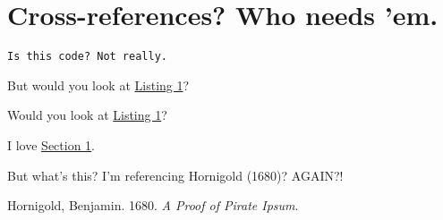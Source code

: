 \hypertarget{me}{%
\section{Cross-references? Who needs 'em.}\label{me}}

\hypertarget{snippet}{%
\label{snippet}}%
\begin{verbatim}
Is this code? Not really.
\end{verbatim}

But would you look at \protect\hyperlink{snippet}{Listing 1}?

Would you look at \protect\hyperlink{snippet.1}{Listing 1}?

I love \protect\hyperlink{me}{Section 1}.

But what's this? I'm referencing Hornigold (1680)? AGAIN?!

\hypertarget{refs}{}
\begin{CSLReferences}{1}{0}
\leavevmode{}%
Hornigold, Benjamin. 1680. \emph{A Proof of Pirate Ipsum}.

\end{CSLReferences}
